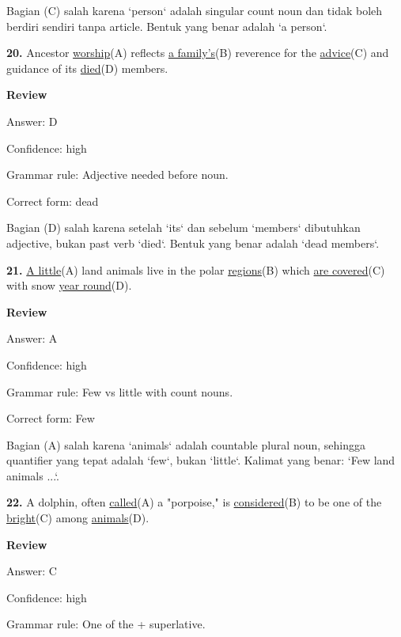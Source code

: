 \documentclass[12pt]{article}
\begin{document}
Bagian (C) salah karena `person` adalah singular count noun dan tidak boleh berdiri sendiri tanpa article. Bentuk yang benar adalah `a person`.\par
\endgroup
\par
\vspace{\questionblockgap}
\noindent\textbf{20.} Ancestor \uline{worship}(A) reflects \uline{a family's}(B) reverence for the \uline{advice}(C) and guidance of its \uline{died}(D) members.
\par
\begingroup
\setlength{\parskip}{0pt}
\setlength{\parindent}{0pt}
\textbf{Review}\par
Answer: D\par
Confidence: high\par
Grammar rule: Adjective needed before noun.\par
Correct form: dead\par
Bagian (D) salah karena setelah `its` dan sebelum `members` dibutuhkan adjective, bukan past verb `died`. Bentuk yang benar adalah `dead members`.\par
\endgroup
\par
\vspace{\questionblockgap}
\noindent\textbf{21.} \uline{A little}(A) land animals live in the polar \uline{regions}(B) which \uline{are covered}(C) with snow \uline{year round}(D).
\par
\begingroup
\setlength{\parskip}{0pt}
\setlength{\parindent}{0pt}
\textbf{Review}\par
Answer: A\par
Confidence: high\par
Grammar rule: Few vs little with count nouns.\par
Correct form: Few\par
Bagian (A) salah karena `animals` adalah countable plural noun, sehingga quantifier yang tepat adalah `few`, bukan `little`. Kalimat yang benar: `Few land animals ...`.\par
\endgroup
\par
\vspace{\questionblockgap}
\noindent\textbf{22.} A dolphin, often \uline{called}(A) a "porpoise," is \uline{considered}(B) to be one of the \uline{bright}(C) among \uline{animals}(D).
\par
\begingroup
\setlength{\parskip}{0pt}
\setlength{\parindent}{0pt}
\textbf{Review}\par
Answer: C\par
Confidence: high\par
Grammar rule: One of the + superlative.\par
\end{document}
